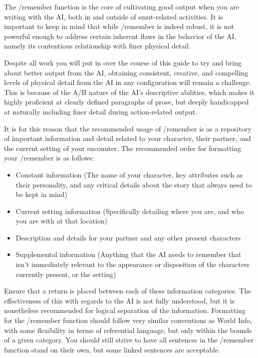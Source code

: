 \documentclass[Source-main.tex]{subfiles}
\begin{document}
The /remember function is the core of cultivating good output when you are writing with the AI, both in and outside of smut-related activities.
It is important to keep in mind that while /remember is indeed robust, it is not powerful enough to address certain inherent flaws in the behavior of the AI, namely its contentious relationship with finer physical detail.

Despite all work you will put in over the course of this guide to try and bring about better output from the AI, obtaining consistent, creative, and compelling levels of physical detail from the AI in any configuration will remain a challenge.
This is because of the A/B nature of the AI’s descriptive abilities, which makes it highly proficient at clearly defined paragraphs of prose, but deeply handicapped at naturally including finer detail during action-related output.

It is for this reason that the recommended usage of /remember is as a repository of important information and detail related to your character, their partner, and the current setting of your encounter.
The recommended order for formatting your /remember is as follows:

\begin{itemize}

\item{Constant information (The name of your character, key attributes such as their personality, and any critical details about the story that always need to be kept in mind)}
\item{Current setting information (Specifically detailing where you are, and who you are with at that location)}
\item{Description and details for your partner and any other present characters}
\item{Supplemental information (Anything that the AI needs to remember that isn’t immediately relevant to the appearance or disposition of the characters currently present, or the setting)}

\end{itemize}

Ensure that a return is placed between each of these information categories.
The effectiveness of this with regards to the AI is not fully understood, but it is nonetheless recommended for logical separation of the information.
Formatting for the /remember function should follow very similar conventions as World Info, with some flexibility in terms of referential language, but only within the bounds of a given category.
You should still strive to have all sentences in the /remember function stand on their own, but some linked sentences are acceptable.
\end{document}
